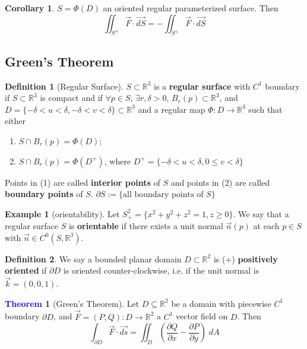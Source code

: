 \documentclass[11pt]{article}
\theoremstyle{definition}
\newtheorem{exmp}{Example}[section]
\theoremstyle{definition}
\newcommand{\R}[0]{\mathbb{R}}
\newtheorem{theorem}{\textcolor{blue}{Theorem}}
\newtheorem{corollary}{Corollary}
\theoremstyle{definition}
\newtheorem{definition}{\textcolor{OliveGreen}{Definition}}
\theoremstyle{remark}
\begin{document}
\begin{corollary}
    $S = \Phi(D)$ an oriented regular parameterized surface. Then 
    \[
        \iint_{S^\mp} \vec{F} \cdot \vec{dS} = - \iint_{S^\pm} \vec{F} \cdot \vec{dS}
    \]  
\end{corollary}

\subsection{Green's Theorem}

\begin{definition}[Regular Surface]
    $S \subset \R^3$ is a \textbf{regular surface} with $C^1$ boundary if $S \subset \R^3$ is
    compact and if $\forall p \in S$, $\exists r, \delta > 0$, $B_r(p) \subset \R^3$, and
    $D = \{ -\delta < u < \delta, -\delta < v < \delta\} \subset \R^3$ and a regular map
    $\Phi : D \to \R^3$ such that either
    \begin{enumerate}
        \item $S \cap B_r(p) = \Phi(D)$;
        \item $S \cap B_r(p) = \Phi(D^+)$, where $D^+ = \{ -\delta < u < \delta, 0 \leq v < \delta\}$   
    \end{enumerate}       
    Points in (1) are called \textbf{interior points} of $S$ and points in (2) are called \textbf{boundary points} of $S$.
    $\partial S := \{\text{all boundary points of } S\}$    
\end{definition}

\begin{exmp}[orientability]
    Let $S_+^2 = \{x^2 + y^2 + z^2 = 1, z \geq 0\}$. We say that a regular surface $S$ is \textbf{orientable}
    if there exists a unit normal $\vec{n}(p)$ at each $p \in S$ with $\vec{n} \in C^0(S, \R^3)$.     
\end{exmp}

\begin{definition}
    We say a bounded planar domain $D \subset \R^2$ is (+) \textbf{positively oriented} if
    $\partial D$ is oriented counter-clockwise, i.e. if the unit normal is $\vec{k} = (0,0,1)$. 
\end{definition}

\begin{theorem}[Green's Theorem]
    Let $D \subseteq \R^2$ be a domain with piecewise $C^1$ boundary $\partial D$, and
    $\vec{F} = (P, Q) : D \to \R^2$ a $C^1$ vector field on $D$. Then
    \[
        \int_{\partial D} \vec{F} \cdot \vec{ds} = \iint_D \left( \frac{\partial Q}{\partial x} - \frac{\partial P}{\partial y} \right) \; dA
    \]      
\end{theorem}
\end{document}

